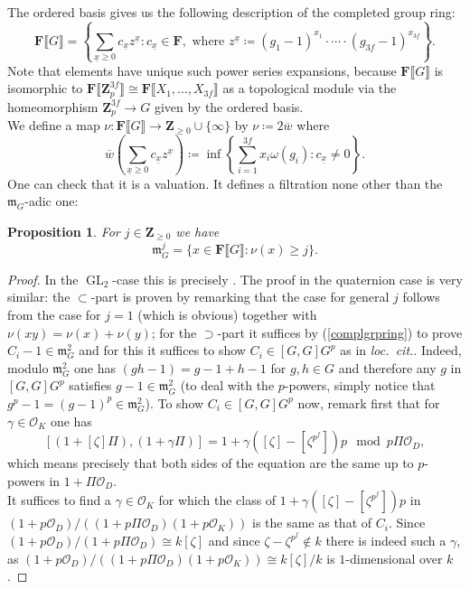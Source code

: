 \documentclass[11pt, oneside]{article}
\DeclareMathOperator{\GL}{GL}
\newtheorem{proposition}{Proposition}
\theoremstyle{definition}
\begin{document}
	The ordered basis gives us the following description of the completed group ring: \begin{equation}\label{complgrpring}
		\mathbf F\llbracket G\rrbracket=\left\{\sum_{\underline x\geq0}c_{\underline x}z^{\underline x}\colon c_{\underline x}\in\mathbf F,\text{ where }z^{\underline x}\coloneqq(g_1-1)^{x_1}\cdot\cdots\cdot(g_{3f}-1)^{x_{3f}}\right\}.
	\end{equation} Note that elements have unique such power series expansions, because $\mathbf F\llbracket G\rrbracket$ is isomorphic to $\mathbf F\llbracket\mathbf Z_p^{3f}\rrbracket\cong\mathbf F\llbracket X_1,\dots,X_{3f}\rrbracket$ as a topological module via the homeomorphism $\mathbf Z_p^{3f}\to G$ given by the ordered basis.\\
	We define a map $\nu\colon\mathbf F\llbracket G\rrbracket\to\mathbf Z_{\geq0}\cup\{\infty\}$ by $\nu\coloneqq2\overline w$ where $$\overline w\left(\sum_{\underline x\geq0}c_{\underline x}z^{\underline x}\right)\coloneqq\inf\left\{\sum_{i=1}^{3f}x_i\omega(g_i)\colon c_{\underline x}\neq0\right\}.$$ One can check that it is a valuation. It defines a filtration none other than the $\mathfrak m_G$-adic one:
	\begin{proposition}\label{maxideals}
		For $j\in\mathbf Z_{\geq0}$ we have $$\mathfrak m_G^j=\{x\in\mathbf F\llbracket G\rrbracket\colon\nu(x)\geq j\}.$$
	\end{proposition}
	\begin{proof}
		In the $\GL_2$-case this is precisely \cite[Prop.~5.3.3]{BHHMS1}. The proof in the quaternion case is very similar: the $\subset$-part is proven by remarking that the case for general $j$ follows from the case for $j=1$ (which is obvious) together with $\nu(xy)=\nu(x)+\nu(y)$; for the $\supset$-part it suffices by (\ref{complgrpring}) to prove $C_i-1\in\mathfrak m_G^2$ and for this it suffices to show $C_i\in[G,G]G^p$ as in \emph{loc.~cit.}. Indeed, modulo $\mathfrak m_G^2$ one has $(gh-1)=g-1+h-1$ for $g,h\in G$ and therefore any $g$ in $[G,G]G^p$ satisfies $g-1\in\mathfrak m_G^2$ (to deal with the $p$-powers, simply notice that $g^p-1=(g-1)^p\in\mathfrak m_G^2$). To show $C_i\in[G,G]G^p$ now, remark first that for $\gamma\in\mathcal O_K$ one has $$[(1+[\zeta]\Pi),(1+\gamma\Pi)]=1+\gamma([\zeta]-[\zeta^{p^f}])p\mod p\Pi\mathcal O_D,$$ which means precisely that both sides of the equation are the same up to $p$-powers in $1+\Pi\mathcal O_D$.\\
		It suffices to find a $\gamma\in\mathcal O_K$ for which the class of $1+\gamma([\zeta]-[\zeta^{p^f}])p$ in $(1+p\mathcal O_D)/\left((1+p\Pi\mathcal O_D)(1+p\mathcal O_K)\right)$ is the same as that of $C_i$. Since $(1+p\mathcal O_D)/(1+p\Pi\mathcal O_D)\cong k[\zeta]$ and since $\zeta-\zeta^{p^f}\not\in k$ there is indeed such a $\gamma$, as $(1+p\mathcal O_D)/\left((1+p\Pi\mathcal O_D)(1+p\mathcal O_K)\right)\cong k[\zeta]/k$ is $1$-dimensional over $k$.
	\end{proof}
\end{document}
